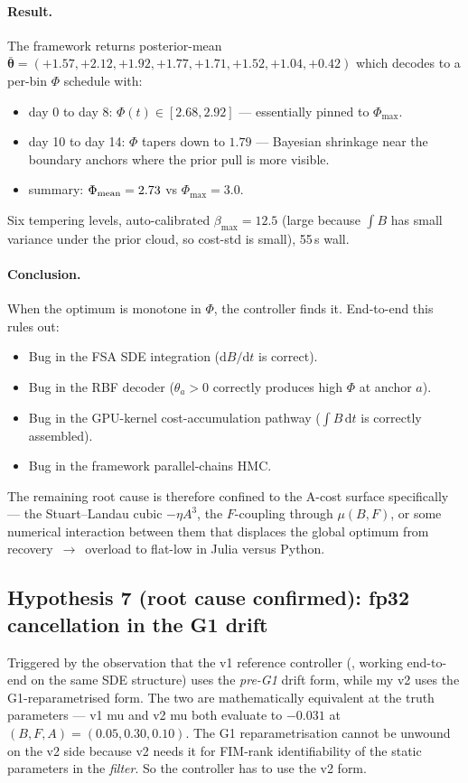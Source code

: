 \documentclass[11pt,a4paper]{article}
\begin{document}
\paragraph{Result.} The framework returns posterior-mean
$\bar{\bm\theta} = (+1.57, +2.12, +1.92, +1.77, +1.71, +1.52, +1.04, +0.42)$
which decodes to a per-bin $\Phi$ schedule with:
\begin{itemize}[itemsep=1pt]
\item day 0 to day 8: $\Phi(t) \in [2.68, 2.92]$ — essentially
  pinned to $\Phi_{\max}$.
\item day 10 to day 14: $\Phi$ tapers down to $1.79$ — Bayesian
  shrinkage near the boundary anchors where the prior pull is more
  visible.
\item summary: $\Phi_{\rm mean} = 2.73$ vs $\Phi_{\max} = 3.0$.
\end{itemize}
Six tempering levels, auto-calibrated $\beta_{\max} = 12.5$
(large because $\int B$ has small variance under the prior cloud, so
cost-std is small), 55\,s wall.

\paragraph{Conclusion.} When the optimum is monotone in $\Phi$, the
controller finds it. End-to-end this rules out:
\begin{itemize}[itemsep=1pt]
\item Bug in the FSA SDE integration ($\mathrm dB/\mathrm dt$ is correct).
\item Bug in the RBF decoder ($\theta_a > 0$ correctly produces
  high $\Phi$ at anchor $a$).
\item Bug in the GPU-kernel cost-accumulation pathway
  ($\int B\,\mathrm dt$ is correctly assembled).
\item Bug in the framework parallel-chains HMC.
\end{itemize}
The remaining root cause is therefore confined to the A-cost surface
specifically --- the Stuart--Landau cubic $-\eta A^3$, the
$F$-coupling through $\mu(B, F)$, or some numerical interaction between
them that displaces the global optimum from recovery~$\to$~overload to
flat-low in Julia versus Python.

\subsection{Hypothesis 7 (root cause confirmed): fp32 cancellation in the G1 drift}

Triggered by the observation that the v1 reference controller
(, working
end-to-end on the same SDE structure) uses the \emph{pre-G1} drift
form, while my v2 uses the G1-reparametrised form. The two are
mathematically equivalent at the truth parameters --- v1 mu and v2 mu
both evaluate to $-0.031$ at $(B,F,A)=(0.05, 0.30, 0.10)$. The G1
reparametrisation cannot be unwound on the v2 side because v2 needs
it for FIM-rank identifiability of the static parameters in the
\emph{filter}. So the controller has to use the v2 form.
\end{document}
